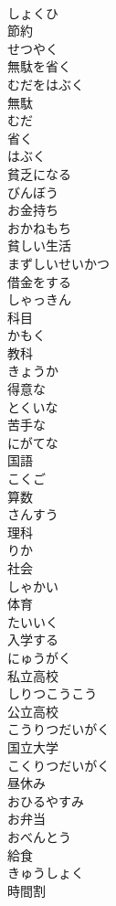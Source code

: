 \documentclass[8pt]{extreport}
\begin{document}
\begin{CJK}{UTF8}{min}
\\	しょくひ
\\	節約	
\\	せつやく
\\	無駄を省く	
\\	むだをはぶく
\\	無駄	
\\	むだ
\\	省く	
\\	はぶく
\\	貧乏になる	
\\	びんぼう
\\	お金持ち	
\\	おかねもち
\\	貧しい生活	
\\	まずしいせいかつ
\\	借金をする	
\\	しゃっきん
\\	科目	
\\	かもく
\\	教科	
\\	きょうか
\\	得意な	
\\	とくいな
\\	苦手な	
\\	にがてな
\\	国語	
\\	こくご
\\	算数	
\\	さんすう
\\	理科	
\\	りか
\\	社会	
\\	しゃかい
\\	体育	
\\	たいいく
\\	入学する	
\\	にゅうがく
\\	私立高校	
\\	しりつこうこう
\\	公立高校	
\\	こうりつだいがく
\\	国立大学	
\\	こくりつだいがく
\\	昼休み	
\\	おひるやすみ
\\	お弁当	
\\	おべんとう
\\	給食	
\\	きゅうしょく
\\	時間割	

\end{CJK}
\end{document}
